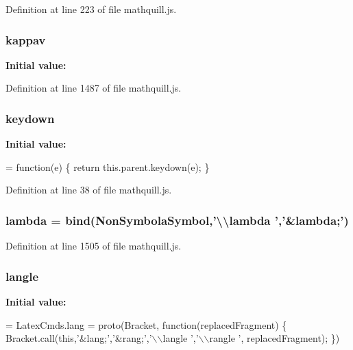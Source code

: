 Definition at line 223 of file mathquill.\-js.

\subsubsection[{kappav}]{ kappav}\label{mathquill_8js_a002bb1a76c1f7db206c7bfcbfe99f0a6}
{\bfseries Initial value\-:}


Definition at line 1487 of file mathquill.\-js.

\subsubsection[{keydown}]{\setlength{\rightskip}{0pt plus 5cm}{\bf \-\_\-} keydown}\label{mathquill_8js_a56c06a9b1c0220113fec9fffd6c7af1a}
{\bfseries Initial value\-:}
\begin{DoxyCode}
= \textcolor{keyword}{function}(e) \{
  \textcolor{keywordflow}{return} this.parent.keydown(e);
\}
\end{DoxyCode}


Definition at line 38 of file mathquill.\-js.

\subsubsection[{lambda}]{ lambda = {\bf bind}({\bf Non\-Symbola\-Symbol},'\textbackslash{}\textbackslash{}lambda ','\&lambda;')}\label{mathquill_8js_ae4ae8e925d0acede7f68a23af3d6d9eb}


Definition at line 1505 of file mathquill.\-js.

\subsubsection[{langle}]{ langle}\label{mathquill_8js_a5ba18c0fa7c61098d411e1f1dd057a22}
{\bfseries Initial value\-:}
\begin{DoxyCode}
= LatexCmds.lang = proto(Bracket, \textcolor{keyword}{function}(replacedFragment) \{
  Bracket.call(\textcolor{keyword}{this},\textcolor{stringliteral}{'&lang;'},\textcolor{stringliteral}{'&rang;'},\textcolor{stringliteral}{'\(\backslash\)\(\backslash\)langle '},\textcolor{stringliteral}{'\(\backslash\)\(\backslash\)rangle '}, replacedFragment);
\})
\end{DoxyCode}


